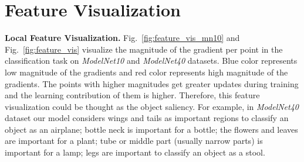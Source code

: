 \documentclass[10pt,twocolumn,letterpaper]{article}
\begin{document}
\section{Feature Visualization}
\label{sec:suppl_feature_visualization}
\textbf{Local Feature Visualization. }Fig.~\ref{fig:feature_vis_mn10} and Fig.~\ref{fig:feature_vis} visualize the magnitude of the gradient per point in the classification task on \textit{ModelNet10} and \textit{ModelNet40} datasets. Blue color represents low magnitude of the gradients and red color represents high magnitude of the gradients. The points with higher magnitudes get greater updates during training and the learning contribution of them is higher. Therefore, this feature visualization could be thought as the object saliency. For example, in \textit{ModelNet40} dataset our model considers wings and tails as important regions to classify an object as an airplane; bottle neck is important for a bottle; the flowers and leaves are important for a plant; tube or middle part (usually narrow parts) is important for a lamp; legs are important to classify an object as a stool.
\setcounter{figure}{-9}
\end{document}
